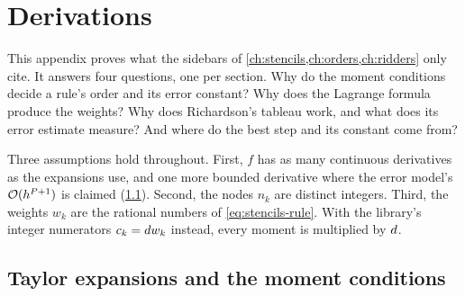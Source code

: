 \chapter{Derivations}\label{ch:derivations}

This appendix proves what the sidebars of \cref{ch:stencils,ch:orders,ch:ridders} only cite. It answers four
questions, one per section. Why do the moment conditions decide a rule's order and its error constant? Why does the
Lagrange formula produce the weights? Why does Richardson's tableau work, and what does its error estimate measure?
And where do the best step and its constant come from?

Three assumptions hold throughout. First, $f$ has as many continuous derivatives as the expansions use, and one more
bounded derivative where the error model's $\mathcal{O}(h^{P + 1})$ is claimed (\cref{sec:derivations-moments}).
Second, the nodes $n_k$ are distinct integers. Third, the weights $w_k$ are the rational numbers of
\cref{eq:stencils-rule}. With the library's integer numerators $c_k = d w_k$ instead, every moment is multiplied
by $d$.

\section{Taylor expansions and the moment conditions}\label{sec:derivations-moments}

